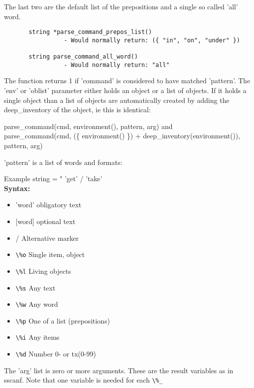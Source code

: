   The last two are the default list of the prepositions and a single so called
  'all' word. 

  \begin{verbatim}
       string *parse_command_prepos_list()
                 - Would normally return: ({ "in", "on", "under" })

       string parse_command_all_word()
                 - Would normally return: "all"
  \end{verbatim}

  The function returns 1 if 'command' is considered to have matched 'pattern'.
  The 'env' or 'oblist' parameter either holds an object or a list of objects.
  If it holds a single object than a list of objects are automatically
  created by adding the deep\_inventory of the object, ie this is identical:

    parse\_command(cmd, environment(), pattern, arg) and \\
    parse\_command(cmd, (\{ environment() \}) + deep\_inventory(environment()),
              pattern, arg)

  'pattern' is a list of words and formats:

    Example string = " 'get' / 'take' \\%
    {\bf Syntax:}
    \begin{itemize}
    \item{'word'}   obligatory text
    \item{[word]}   optional text
    \item{/}        Alternative marker
    \item{\verb+\%o+}   Single item, object
    \item{\verb+\%l+}   Living objects
    \item{\verb+\%s+}   Any text
    \item{\verb+\%w+}    Any word
    \item{\verb+\%p+}   One of a list (prepositions)
    \item{\verb+\%i+}   Any items
    \item{\verb+\%d+}    Number 0- or tx(0-99)
    \end{itemize}

    The 'arg' list is zero or more arguments. These are the result variables
    as in sscanf. Note that one variable is needed for each \verb+\%_+

